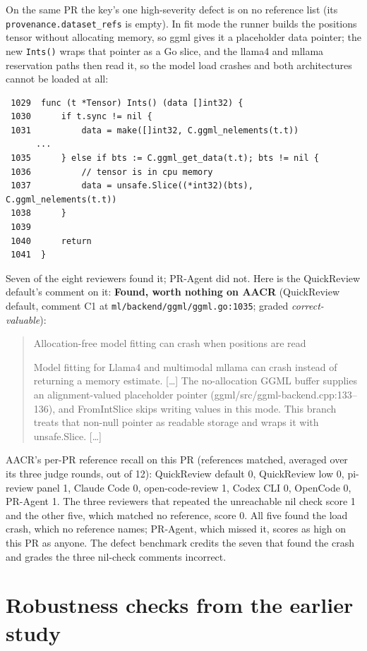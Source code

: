 \documentclass[11pt,a4paper]{article}
\newcommand{\qcr}{QuickReview}
\newcommand{\code}[1]{\texttt{#1}}
\begin{document}
On the same PR the key's one high-severity defect is on no reference
list (its \code{provenance.dataset\_refs} is empty). In fit mode the runner
builds the positions tensor without allocating memory, so ggml gives it a
placeholder data pointer; the new \code{Ints()} wraps that pointer as a Go
slice, and the llama4 and mllama reservation paths then read it, so the
model load crashes and both architectures cannot be loaded at all:
{\footnotesize
\begin{verbatim}
 1029  func (t *Tensor) Ints() (data []int32) {
 1030      if t.sync != nil {
 1031          data = make([]int32, C.ggml_nelements(t.t))
      ...
 1035      } else if bts := C.ggml_get_data(t.t); bts != nil {
 1036          // tensor is in cpu memory
 1037          data = unsafe.Slice((*int32)(bts), C.ggml_nelements(t.t))
 1038      }
 1039  
 1040      return
 1041  }
\end{verbatim}
}
Seven of the eight reviewers found it; PR-Agent did not. Here is the \qcr{} default's comment on it:
\noindent\textbf{Found, worth nothing on AACR} (QuickReview default, comment C1 at \code{ml/\allowbreak{}backend/\allowbreak{}ggml/\allowbreak{}ggml.go:1035}; graded \emph{correct-valuable}):
\begin{quote}\small
Allocation-free model fitting can crash when positions are read\par Model fitting for Llama4 and multimodal mllama can crash instead of returning a memory estimate. [\ldots] The no-allocation GGML buffer supplies an alignment-valued placeholder pointer (ggml/src/ggml-backend.cpp:133--136), and FromIntSlice skips writing values in this mode. This branch treats that non-null pointer as readable storage and wraps it with unsafe.Slice. [\ldots]
\end{quote}
\noindent AACR's per-PR reference recall on this PR (references matched,
averaged over its three judge rounds, out of 12): QuickReview default 0, QuickReview low 0, pi-review panel 1, Claude Code 0, open-code-review 1, Codex CLI 0, OpenCode 0, PR-Agent 1.
The three reviewers that repeated the unreachable nil check score 1 and
the other five, which matched no reference, score 0. All five found the load
crash, which no reference names; PR-Agent, which missed it, scores as high
on this PR as anyone. The defect benchmark credits the seven that found the
crash and grades the three nil-check comments incorrect.
\endgroup

\section{Robustness checks from the earlier study}
\label{sec:sol}
\end{document}
